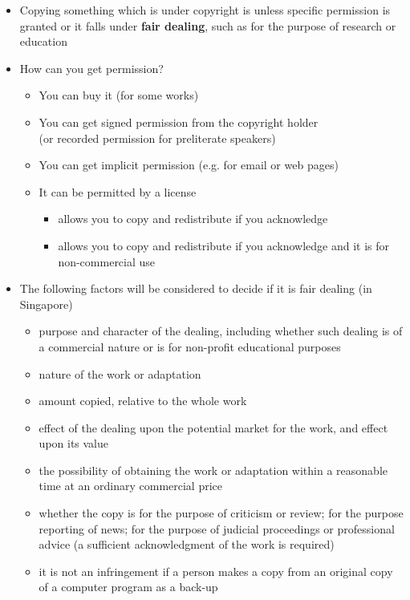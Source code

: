 \documentclass[a4paper,landscape,headrule,footrule,xetex]{foils}
\begin{document}
\begin{itemize}
\item Copying something which is under copyright is  unless
  specific permission is granted or it falls under \textbf{fair
    dealing}, such as for the purpose of research or education
\item How can you get permission?
  \begin{itemize}
  \item You can buy it (for some works)
  \item You can get signed permission from the copyright holder
\\ (or recorded permission for preliterate speakers)
  \item You can get implicit permission (e.g. for email or web pages)
  \item It can be permitted by a license
    \begin{itemize}
    \item {} allows you to copy and redistribute if you acknowledge
    \item {} allows you to copy and redistribute if you
      acknowledge and it is for non-commercial use
    \end{itemize}
  \end{itemize}

\newpage {}
\item The following factors will be considered to decide if it is fair
  dealing (in Singapore)
  \begin{itemize}
  \item  purpose and character of the dealing, including whether such dealing is of a commercial nature or is for non-profit educational purposes
  \item  nature of the work or adaptation
  \item amount copied, relative to the whole work
  \item  effect of the dealing upon the potential market for the work, and effect upon its value
  \item the possibility of obtaining the work or adaptation within a reasonable time at an ordinary commercial price
  \item whether the copy is for the purpose of criticism or review; for the purpose reporting of news; for the purpose of judicial proceedings or professional advice (a sufficient acknowledgment of the work is required)
  \item it is not an infringement if a person makes a copy from an
    original copy of a computer program  as a back-up
  \end{itemize}
\end{itemize}
\end{document}
